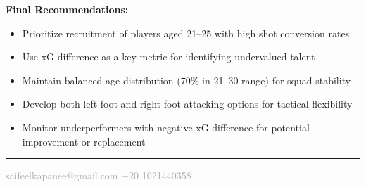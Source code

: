\documentclass[12pt,a4paper]{article}
\begin{document}
\begin{tcolorbox}[colback=primary!10, colframe=primary, arc=5pt, boxrule=1.5pt]
\textcolor{primary}{\textbf{\faLightbulb\hspace{0.3cm} Final Recommendations:}}
\begin{itemize}
    \item Prioritize recruitment of players aged 21–25 with high shot conversion rates
    \item Use xG difference as a key metric for identifying undervalued talent
    \item Maintain balanced age distribution (70\% in 21–30 range) for squad stability
    \item Develop both left-foot and right-foot attacking options for tactical flexibility
    \item Monitor underperformers with negative xG difference for potential improvement or replacement
\end{itemize}
\end{tcolorbox}

\vspace{0.5cm}

\begin{center}
\textcolor{primary}{\rule{0.7\textwidth}{0.5pt}}
\end{center}

\begin{center}
\textcolor{darkgray}{\small \faEnvelope\hspace{0.2cm} saifeelkapanee@gmail.com \hspace{0.5cm} \faPhone\hspace{0.2cm} +20 1021440358}
\end{center}
\end{document}
